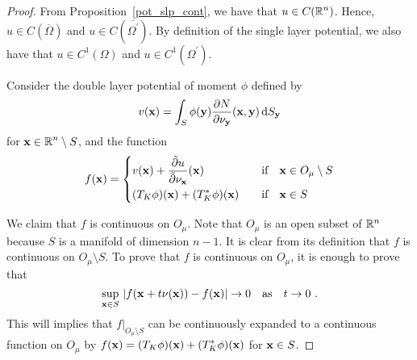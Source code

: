 \begin{proof}
From Proposition~\ref{pot_slp_cont}, we have that
$\displaystyle u \in C(\mathbb{R}^n)$.
Hence, $u \in C(\overline{\Omega})$ and
$\displaystyle u \in C(\overline{\Omega^{\prime}})$.  By definition of
the single layer potential, we also have that
$\displaystyle u \in C^1(\Omega)$ and
$\displaystyle u \in C^1(\Omega^{\prime})$.

Consider the double layer potential of moment $\phi$ defined by
\[
v(\mathbf{x}) = \int_S \phi(\mathbf{y})
\frac{\partial{N}}{\partial \mathbf{\nu}_{\mathbf{y}}}(\mathbf{x},\mathbf{y}) \,\mathrm{d}{S}_{\mathbf{y}}
\]
for $\displaystyle \mathbf{x} \in \mathbb{R}^n \setminus S$, and the function
\[
f(\mathbf{x}) =
\begin{cases}
\displaystyle v(\mathbf{x}) + \frac{\tilde{\partial}{u}}{\tilde{\partial}{\mathbf{\nu}_{\mathbf{x}}}}(\mathbf{x}) & \quad
\text{if} \quad \mathbf{x} \in O_\mu \setminus S \\[0.7em]
\displaystyle
(T_K\phi)(\mathbf{x}) + (T^\ast_K\phi)(\mathbf{x}) & \quad \text{if} \quad
\mathbf{x} \in S
\end{cases}
\]

 We claim that $f$ is continuous on $O_\mu$.  Note that
$O_\mu$ is an open subset of $\mathbb{R}^n$ because $S$ is a manifold of
dimension $n-1$.  It is clear
from its definition that $f$ is continuous on $O_\mu \setminus S$.
To prove that $f$ is continuous on $O_\mu$, it is enough to prove that
\[
\sup_{\mathbf{x}\in S}\,
\left| f(\mathbf{x}+t\mathbf{\nu}(\mathbf{x})) - f(\mathbf{x})\right| \rightarrow
0 \quad \text{as} \quad t \rightarrow 0 \ .
\]
This will implies that
$\displaystyle f\big|_{O_\mu \setminus S}$ can be
continuously expanded to a continuous function on $O_\mu$ by
$\displaystyle f(\mathbf{x}) = (T_K\phi)(\mathbf{x}) + (T^\ast_K\phi)(\mathbf{x})$
for $\mathbf{x} \in S$.


\end{proof}
